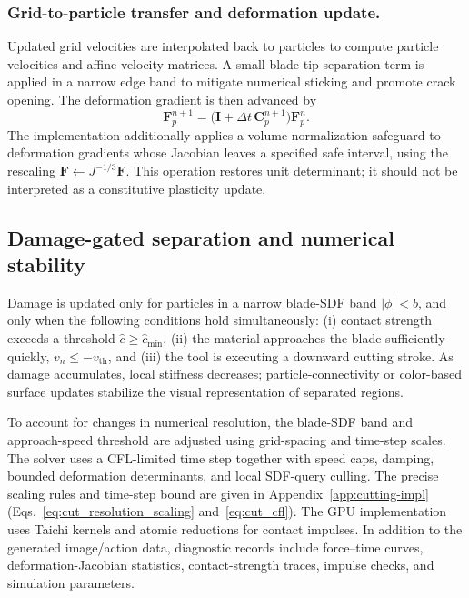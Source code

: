 \subsubsection{Grid-to-particle transfer and deformation update.}
Updated grid velocities are interpolated back to particles to compute particle velocities and affine velocity matrices. A small blade-tip separation term is applied in a narrow edge band to mitigate numerical sticking and promote crack opening. The deformation gradient is then advanced by
\begin{equation}\label{eq:Fupdate}
  \mathbf{F}_p^{n+1}=\bigl(\mathbf{I}+\Delta t\,\mathbf{C}_p^{n+1}\bigr)
  \mathbf{F}_p^n.
\end{equation}
The implementation additionally applies a volume-normalization safeguard to deformation gradients whose Jacobian leaves a specified safe interval, using the rescaling $\mathbf{F}\leftarrow J^{-1/3}\mathbf{F}$. This operation restores unit determinant; it should not be interpreted as a constitutive plasticity update.

\subsection{Damage-gated separation and numerical stability}
\label{subsec:cut_damage}

Damage is updated only for particles in a narrow blade-SDF band $|\phi|<b$, and only when the following conditions hold simultaneously: (i) contact strength exceeds a threshold $\hat c\ge\hat c_{\min}$, (ii) the material approaches the blade sufficiently quickly, $v_n\le-v_{\mathrm{th}}$, and (iii) the tool is executing a downward cutting stroke. As damage accumulates, local stiffness decreases; particle-connectivity or color-based surface updates stabilize the visual representation of separated regions.

To account for changes in numerical resolution, the blade-SDF band and approach-speed threshold are adjusted using grid-spacing and time-step scales. The solver uses a CFL-limited time step together with speed caps, damping, bounded deformation determinants, and local SDF-query culling. The precise scaling rules and time-step bound are given in Appendix~\ref{app:cutting-impl} (Eqs.~\eqref{eq:cut_resolution_scaling} and~\eqref{eq:cut_cfl}). The GPU implementation uses Taichi kernels and atomic reductions for contact impulses. In addition to the generated image/action data, diagnostic records include force--time curves, deformation-Jacobian statistics, contact-strength traces, impulse checks, and simulation parameters.

